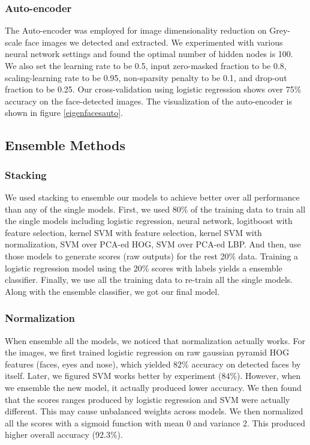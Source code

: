 \subsubsection{Auto-encoder}
The Auto-encoder was employed for image dimensionality reduction on Grey-scale face images we detected and extracted. We experimented with various neural network settings and found the optimal number of hidden nodes is 100. We also set the learning rate to be 0.5, input zero-masked fraction to be 0.8, scaling-learning rate to be 0.95, non-sparsity penalty to be 0.1, and drop-out fraction to be 0.25. Our cross-validation using logistic regression shows over 75\% accuracy on the face-detected images.
The visualization of the auto-encoder is shown in figure \ref{eigenfacesauto}. 

\subsection{Ensemble Methods}
\subsubsection{Stacking}
We used stacking to ensemble our models to achieve better over all performance than any of the single models. First, we used 80\% of the training data to train all the single models including logistic regression, neural network, logitboost with feature selection, kernel SVM with feature selection, kernel SVM with normalization, SVM over PCA-ed HOG, SVM over PCA-ed LBP. And then, use those models to generate scores (raw outputs) for the rest 20\% data. Training a logistic regression model using the 20\% scores with labels yields a ensemble classifier. Finally, we use all the training data to re-train all the single models. Along with the ensemble classifier, we got our final model. 
\subsubsection{Normalization}
When ensemble all the models, we noticed that normalization actually works. For the images, we first trained logistic regression on raw gaussian pyramid HOG features (faces, eyes and nose), which yielded 82\% accuracy on detected faces by itself. Later, we figured SVM works better by experiment (84\%). However, when we ensemble the new model, it actually produced lower accuracy. We then found that the scores ranges produced by logistic regression and SVM were actually different. This may cause unbalanced weights across models. We then normalized all the scores with a sigmoid function with mean 0 and variance 2. This produced higher overall accuracy (92.3\%). 

